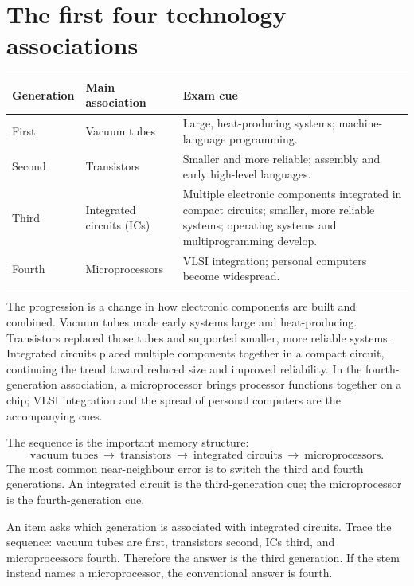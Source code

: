 \section{The first four technology associations}
\begin{center}
\begin{tabular}{p{}p{}p{}}
\textbf{Generation} & \textbf{Main association} & \textbf{Exam cue}\\
\hline
First & Vacuum tubes & Large, heat-producing systems; machine-language programming.\\
Second & Transistors & Smaller and more reliable; assembly and early high-level languages.\\
Third & Integrated circuits (ICs) & Multiple electronic components integrated
in compact circuits; smaller, more reliable systems; operating systems and
multiprogramming develop.\\
Fourth & Microprocessors & VLSI integration; personal computers become
widespread.\\
\end{tabular}
\end{center}

The progression is a change in how electronic components are built and
combined. Vacuum tubes made early systems large and heat-producing.
Transistors replaced those tubes and supported smaller, more reliable
systems. Integrated circuits placed multiple components together in a
compact circuit, continuing the trend toward reduced size and improved
reliability. In the fourth-generation association, a microprocessor brings
processor functions together on a chip; VLSI integration and the spread of
personal computers are the accompanying cues.

The sequence is the important memory structure:
\[
\text{vacuum tubes}\ \longrightarrow\ \text{transistors}\
\longrightarrow\ \text{integrated circuits}\ \longrightarrow\
\text{microprocessors}.
\]
The most common near-neighbour error is to switch the third and fourth
generations. An integrated circuit is the third-generation cue; the
microprocessor is the fourth-generation cue.

\begin{example}
An item asks which generation is associated with integrated circuits. Trace
the sequence: vacuum tubes are first, transistors second, ICs third, and
microprocessors fourth. Therefore the answer is the third generation. If
the stem instead names a microprocessor, the conventional answer is fourth.
\end{example}

